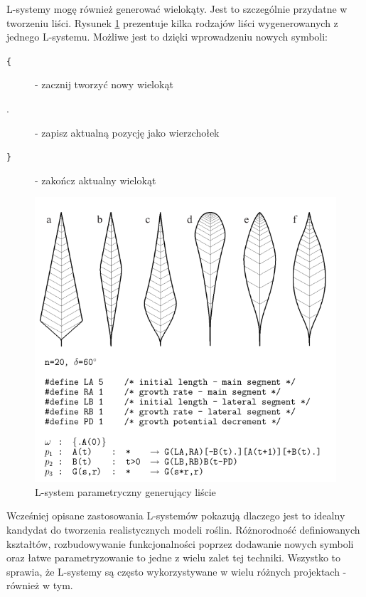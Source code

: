 \documentclass[inz,longabstract]{iithesis}
\begin{document}
            L-systemy mogę również generować wielokąty. Jest to szczególnie przydatne w tworzeniu liści. Rysunek \ref{fig:lsystemLeafs} prezentuje kilka rodzajów liści wygenerowanych z jednego L-systemu. Możliwe jest to dzięki wprowadzeniu nowych symboli:
            \begin{description}
                \item[\texttt{\{}] - zacznij tworzyć nowy wielokąt 
                \item[.] - zapisz aktualną pozycję jako wierzchołek
                \item[\texttt{\}}] - zakończ aktualny wielokąt
            \end{description}
            \begin{figure}[H]
                \includegraphics[width=\linewidth]{lsystemLeafs.png}
                \caption{L-system parametryczny generujący liście \cite{plants}} 
                \label{fig:lsystemLeafs}
            \end{figure}
            
            Wcześniej opisane zastosowania L-systemów pokazują dlaczego jest to idealny kandydat do tworzenia realistycznych modeli roślin. Różnorodność definiowanych kształtów, rozbudowywanie funkcjonalności poprzez dodawanie nowych symboli oraz łatwe parametryzowanie to jedne z wielu zalet tej techniki. Wszystko to sprawia, że L-systemy są często wykorzystywane w wielu różnych projektach - również w tym. 
            
\end{document}
